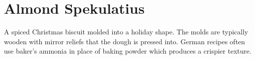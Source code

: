\section[Spekulatius]{
    Almond Spekulatius
}

\begin{recipestats}[
        servings=servings,
        preptime=45 \minute~(+chill),
        bakingtime=10 \minute,
    ]
\end{recipestats}

\begin{recipeabstract}
    A spiced Christmas biscuit molded into a holiday shape.
    The molds are typically wooden with mirror reliefs that the dough is pressed into.
    German recipes often use baker's ammonia in place of baking powder which
    produces a crispier texture.
\end{recipeabstract}

\begin{ingredientcolumns}
    \begin{ingredientblock}
        \\
        \\
        \\
        \\
        \\
        \\
        \\
    \end{ingredientblock}
    \begin{ingredientblock}
        \\
        \\
        \\
        \\
        \\
        \\
        \\
    \end{ingredientblock}
\end{ingredientcolumns}

